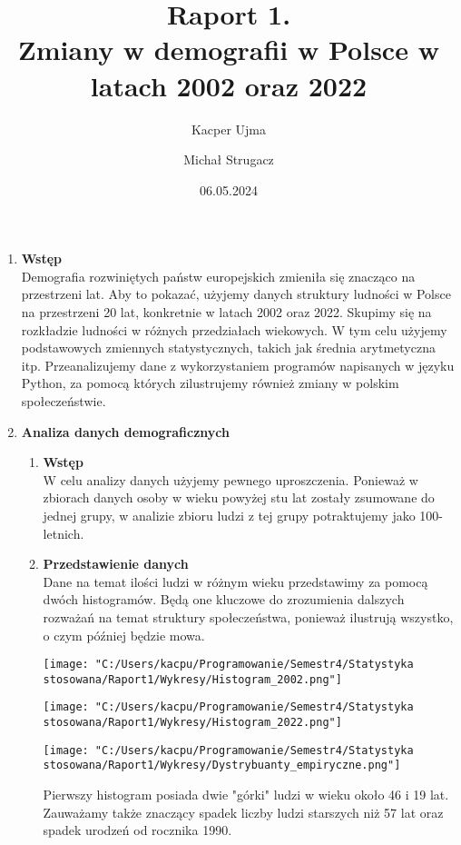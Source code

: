 \documentclass{article}
\title{Raport 1. \\ \large Zmiany w demografii w Polsce w latach 2002 oraz 2022}
\author{Kacper Ujma \and Michał Strugacz}
\date{06.05.2024}
\begin{document}
	\maketitle
	
	\begin{enumerate}
		\item \textbf{Wstęp}\\
		Demografia rozwiniętych państw europejskich zmieniła się znacząco na przestrzeni lat. Aby to pokazać, użyjemy danych struktury ludności w Polsce na przestrzeni 20 lat, konkretnie w latach 2002\cite{bib2002} oraz 2022\cite{bib2023}. Skupimy się na rozkładzie ludności w różnych przedziałach wiekowych. W tym celu użyjemy podstawowych zmiennych statystycznych, takich jak średnia arytmetyczna itp. Przeanalizujemy dane z wykorzystaniem programów napisanych w języku Python, za pomocą których zilustrujemy również zmiany w polskim społeczeństwie.
		
		
		\item \textbf{Analiza danych demograficznych}
		
		\begin{enumerate}[label*=\arabic*.]
			\item \textbf{Wstęp}\\
			W celu analizy danych użyjemy pewnego uproszczenia. Ponieważ w zbiorach danych osoby w wieku powyżej stu lat zostały zsumowane do jednej grupy, w analizie zbioru ludzi z tej grupy potraktujemy jako 100-letnich.
			
			\item \textbf{Przedstawienie danych}\\
			Dane na temat ilości ludzi w różnym wieku przedstawimy za pomocą dwóch histogramów. Będą one kluczowe do zrozumienia dalszych rozważań na temat struktury społeczeństwa, ponieważ ilustrują wszystko, o czym później będzie mowa.
			
			\texttt{[image: "C:/Users/kacpu/Programowanie/Semestr4/Statystyka stosowana/Raport1/Wykresy/Histogram\_2002.png"]}
			
			\texttt{[image: "C:/Users/kacpu/Programowanie/Semestr4/Statystyka stosowana/Raport1/Wykresy/Histogram\_2022.png"]}
			
			\texttt{[image: "C:/Users/kacpu/Programowanie/Semestr4/Statystyka stosowana/Raport1/Wykresy/Dystrybuanty\_empiryczne.png"]}
			
			Pierwszy histogram posiada dwie "górki" ludzi w wieku około 46 i 19 lat. Zauważamy także znaczący spadek liczby ludzi starszych niż 57 lat oraz spadek urodzeń od rocznika 1990.
			

\end{enumerate}
\end{enumerate}
\end{document}
